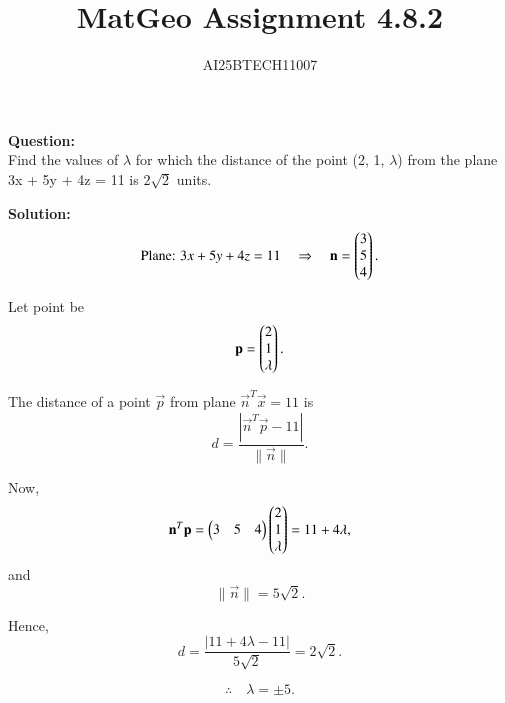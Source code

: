 \documentclass[journal]{IEEEtran}
\begin{document}

\vspace{3cm}

\title{MatGeo Assignment 4.8.2}
\author{AI25BTECH11007}
 \maketitle
{\let\newpage\relax\maketitle}

\renewcommand{\thefigure}{\theenumi}
\renewcommand{\thetable}{\theenumi}
\setlength{\intextsep}{10pt} %


\renewcommand{\thetable}{\theenumi}
\noindent
\textbf{Question:}\\
Find the values of $\lambda$ for which the distance of the point (2, 1, $\lambda$) from the plane\\
3x + 5y + 4z = 11 is $2\sqrt{2}$ units.

\bigskip
\noindent
\textbf{Solution:}\\
\[
\text{Plane: } 3x+5y+4z=11 
\quad\Rightarrow\quad 
\mathbf{n}=\begin{pmatrix}3\\5\\4\end{pmatrix}.
\]

Let point be 
\[
\mathbf{p}=\begin{pmatrix}2\\1\\\lambda\end{pmatrix}.
\]

The distance of a point \(\vec p\) from plane \(\vec n^T\vec x=11\) is
\begin{equation}
d=\frac{|\vec n^T\vec p-11|}{\|\vec n\|}.
\end{equation}

Now,
\begin{equation}
\mathbf {n}^T\mathbf {p}
= \begin{pmatrix}3 & 5 & 4\end{pmatrix}\begin{pmatrix}2\\1\\\lambda\end{pmatrix} 
= 11+4\lambda,
\end{equation}
and
\begin{equation}
\|\vec n\|
= 5\sqrt{2}.
\end{equation}

Hence,
\begin{equation}
d=\frac{|11+4\lambda-11|}{5\sqrt{2}} = 2\sqrt{2}.
\end{equation}

\begin{equation}
\therefore \quad \lambda=\pm 5.
\end{equation}
\end{document}
